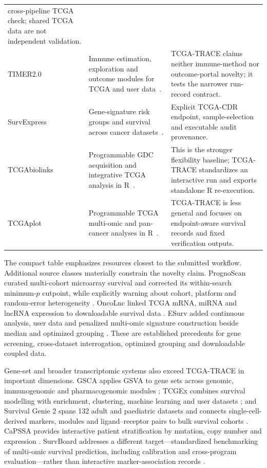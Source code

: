 \documentclass[12pt]{article}
\begin{document}
\begin{table}[H]
\begin{tabularx}{\linewidth}{>{\raggedright\arraybackslash}p{1.9cm}XX}
cross-pipeline TCGA check; shared TCGA data are not independent validation. \\
TIMER2.0 & Immune estimation, exploration and outcome modules for TCGA and
user data~\citep{timer2020}. & TCGA-TRACE claims neither immune-method nor
outcome-portal novelty; it tests the narrower run-record contract. \\
SurvExpress & Gene-signature risk groups and survival across cancer
datasets~\citep{survexpress2013}. & Explicit TCGA-CDR endpoint, sample-selection
and executable audit provenance. \\
TCGAbiolinks & Programmable GDC acquisition and integrative TCGA analysis in
R~\citep{tcgabiolinks2016}. & This is the stronger flexibility baseline;
TCGA-TRACE standardizes an interactive run and exports standalone R
re-execution. \\
TCGAplot & Programmable TCGA multi-omic and pan-cancer analyses in
R~\citep{tcgaplot2023}. & TCGA-TRACE is less general and focuses on
endpoint-aware survival records and fixed verification outputs. \\
\bottomrule
\end{tabularx}
\endgroup
\end{table}

\begingroup
\small
{}
The compact table emphasizes resources closest to the submitted workflow.
Additional source classes materially constrain the novelty claim. PrognoScan
curated multi-cohort microarray survival and corrected its within-search
minimum-\(p\) cutpoint, while explicitly warning about cohort, platform and
random-error heterogeneity \citep{prognoscan2009}. OncoLnc linked TCGA mRNA,
miRNA and lncRNA expression to downloadable survival data
\citep{oncolnc2016}. ESurv added continuous analysis, user data and penalized
multi-omic signature construction beside median and optimized grouping
\citep{esurv2020}. These are established precedents for gene screening,
cross-dataset interrogation, optimized grouping and downloadable coupled data.

Gene-set and broader transcriptomic systems also exceed TCGA-TRACE in important
dimensions. GSCA applies GSVA to gene sets across genomic, immunogenomic and
pharmacogenomic modules \citep{gsca2023}; TCGEx combines survival modelling
with enrichment, clustering, machine learning and user datasets
\citep{tcgex2025}; and Survival Genie 2 spans 132 adult and paediatric datasets
and connects single-cell-derived markers, modules and ligand--receptor pairs to
bulk survival cohorts \citep{survivalGenie2026}. CaPSSA provides interactive
patient stratification by mutation, copy number and expression
\citep{capssa2019}. SurvBoard addresses a different target---standardized
benchmarking of multi-omic survival prediction, including calibration and
cross-program evaluation---rather than interactive marker-association records
\citep{survboard2025}.
\end{document}
